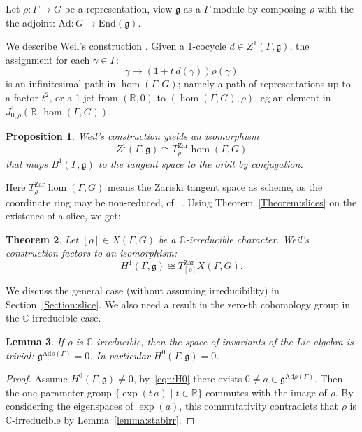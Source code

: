 \documentclass[a4paper,11pt]{article}
\newtheorem{Theorem}{Theorem}[section]
\newtheorem{Proposition}[Theorem]{Proposition}
\newtheorem{Lemma}[Theorem]{Lemma}
\begin{document}
Let $\rho\colon\Gamma\to G$ be a representation, view $\mathfrak g$ as a $\Gamma$-module by composing $\rho$ with the 
the adjoint: $\mathrm{Ad}\colon G\to \mathrm{End}(\mathfrak g) $.
 







We describe Weil's construction \cite{LubotzkyMagid, Weil}. Given a 1-cocycle  $d\in Z^1(\Gamma,\mathfrak g)$,
the assignment for each $\gamma\in \Gamma$:
$$
\gamma\to (1+ t \, d(\gamma)) \rho(\gamma)
$$
is an infinitesimal path in $\hom(\Gamma, G)$; namely a path of representations
up to a factor $t^2$, or a 1-jet  from $(\mathbb{R}, 0)$ to 
$( \hom(\Gamma, G), \rho) $, eg an element in $J^1_{0,\rho}(\mathbb{R}, \hom(\Gamma, G))$. 

\begin{Proposition}\cite{LubotzkyMagid, Weil}
 Weil's construction yields an isomorphism
 $$
 Z^1(\Gamma,\mathfrak g)\cong  T^{\mathrm{Zar}}_\rho
\hom(\Gamma, G)
 $$
that maps $ B^1(\Gamma,\mathfrak g)$ to the tangent space 
to the orbit by conjugation. 
\end{Proposition}
  
Here $ T^{\mathrm{Zar}}_\rho
\hom(\Gamma, G)
 $ means the Zariski tangent space as scheme, as the 
 coordinate ring may be non-reduced, cf.~\cite{HeusenerPorti23}.
%
Using Theorem~\ref{Theorem:slices} on the existence of a slice, we get:

\begin{Theorem}
Let $[\rho]\in X(\Gamma, G)$ be a $\mathbb C$-irreducible character. Weil's construction factors to an isomorphism:
$$
 H^1(\Gamma,\mathfrak g)\cong  T^{\mathrm{Zar}}_{[\rho]}
X(\Gamma, G).
$$
\end{Theorem}

We discuss the general case (without assuming irreducibility) in Section~\ref{Section:slice}.
We also need  a result in the zero-th cohomology group in the 
$\mathbb C$-irreducible case.

\begin{Lemma}
\label{Lemma:H0trivial}
 If $\rho $ is $\mathbb C$-irreducible, then the space of invariants of the Lie algebra is trivial:
 $\mathfrak g^{\mathrm{Ad} {\rho(\Gamma)}}=0$.
 In particular $H^0(\Gamma, \mathfrak g)= 0$.
\end{Lemma}


\begin{proof}
 Assume $H^0(\Gamma, \mathfrak g)\neq 0$,   by~\eqref{eqn:H0}
 there exists $0\neq a\in  \mathfrak g^{\mathrm{Ad}{\rho(\Gamma)}}$. Then
 the one-parameter group $\{\exp ( t\, a)\mid t\in\mathbb R\}$
 commutes with the image of $\rho$. By considering the eigenspaces of  $\exp (  a)$, this commutativity contradicts that $\rho$ is 
 $\mathbb C$-irreducible by
 Lemma~\ref{lemma:stabirr}.
\end{proof}
 
\end{document}
